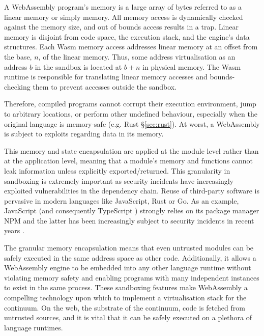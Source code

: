 A WebAssembly program's memory is a large array of bytes referred to as a linear memory or simply memory. All memory access is dynamically checked against the memory size, and out of bounds access results in a trap. Linear memory is disjoint from code space, the execution stack, and the engine's data structures. Each Wasm memory access addresses linear memory at an offset from the base, $n$, of the linear memory. Thus, some address virtualisation as an address $b$ in the sandbox is located at $b + n$ in physical memory. The Wasm runtime is responsible for translating linear memory accesses and bounds-checking them to prevent accesses outside the sandbox.

Therefore, compiled programs cannot corrupt their execution environment, jump to arbitrary locations, or perform other undefined behaviour, especially when the original language is memory-safe (e.g. Rust §\ref{sec:rust}). At worst, a WebAssembly is subject to exploits regarding data in its memory.

This memory and state encapsulation are applied at the module level rather than at the application level, meaning that a module's memory and functions cannot leak information unless explicitly exported/returned. This granularity in sandboxing is extremely important as security incidents have increasingly exploited vulnerabilities in the dependency chain. Reuse of third-party software is pervasive in modern languages like JavaScript, Rust or Go. As an example, JavaScript (and consequently TypeScript \cite{typescript}) strongly relies on its package manager NPM and the latter has been increasingly subject to security incidents in recent years \cite{npm-security}.

The granular memory encapsulation means that even untrusted modules can be safely executed in the same address space as other code. Additionally, it allows a WebAssembly engine to be embedded into any other language runtime without violating memory safety and enabling programs with many independent instances to exist in the same process. These sandboxing features make WebAssembly a compelling technology upon which to implement a virtualisation stack for the continuum. On the web, the substrate of the continuum, code is fetched from untrusted sources, and it is vital that it can be safely executed on a plethora of language runtimes.


